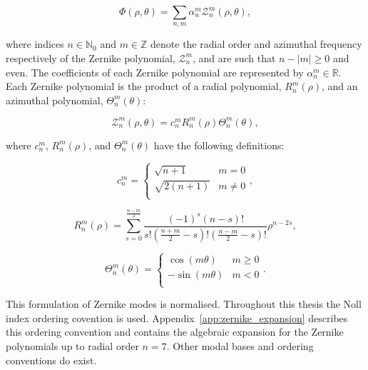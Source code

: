 \begin{equation}\label{eq:phase_zernike_expansion}
\Phi\left(\rho,\theta\right) = \sum\limits_{n,m}\alpha^{m}_{n}\mathcal{Z}^{m}_{n}\left(\rho,\theta\right),
\end{equation}

where indices $n \in \mathbb{N}_{0}$ and $m \in \mathbb{Z}$ denote the radial order 
and azimuthal frequency respectively of the Zernike polynomial, 
$\mathcal{Z}^{m}_{n}$, and are such that $n - \left|m\right| \ge 0$ and even. The
coefficients of each Zernike polynomial are represented by $\alpha^{m}_{n} \in 
\mathbb{R}$. Each Zernike polynomial is the product of a radial polynomial,
$R^{m}_{n}(\rho)$, and an azimuthal polynomial, $\Theta^{m}_{n}(\theta)$:

\begin{equation}\label{eq:zernike_polynomial}
\mathcal{Z}^{m}_{n}\left(\rho,\theta\right) = c^{m}_{n}R^{m}_{n}(\rho)\Theta^{m}_{n}(\theta),
\end{equation}

where $c^{m}_{n}$, $R^{m}_{n}(\rho)$, and $\Theta^{m}_{n}(\theta)$ have the following definitions:

\begin{equation}\label{eq:zernike_polynomial_c}
c^{m}_{n} = 
\begin{cases}
\sqrt{n + 1} & m = 0\\
\sqrt{2(n + 1)} & m \ne 0\\
\end{cases},
\end{equation}

\begin{equation}\label{eq:zernike_polynomial_R}
R^{m}_{n}(\rho) = \sum_{s=0}^{\frac{n-m}{2}}{\frac{(-1)^{s}(n-s)!}{s!\left(\frac{n+m}{2}-s\right)!\left(\frac{n-m}{2}-s\right)!}\rho^{n-2s}},
\end{equation}

\begin{equation}\label{eq:zernike_polynomial_Theta}
\Theta^{m}_{n}(\theta) =
\begin{cases}
\cos(m\theta) & m \ge 0\\
-\sin(m\theta) & m < 0\\
\end{cases}.
\end{equation}

This formulation of Zernike modes is normalised. Throughout this thesis the 
Noll index ordering covention is used\cite{noll1976zernike}. 
Appendix~\ref{app:zernike_expansion} describes this ordering convention and 
contains the algebraic expansion for the Zernike polynomials up to radial 
order $n = 7$. Other modal bases and ordering conventions do 
exist\cite{thibos2002standards,loomis1978computer,soloviev2017optimal,
burton1984effects}. 

